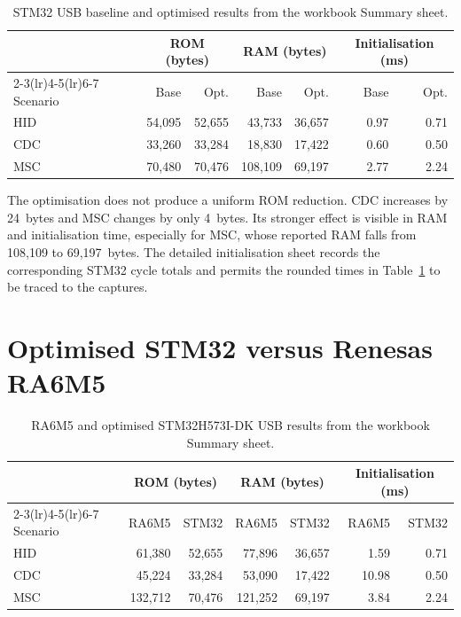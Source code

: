 \begin{table}[H]
\centering
\small
\caption{STM32 USB baseline and optimised results from the workbook Summary sheet.}
\label{tab:cascade-stm32-optimisation}
\begin{tabular}{lrrrrrr}
\toprule
& \multicolumn{2}{c}{ROM (bytes)} & \multicolumn{2}{c}{RAM (bytes)} & \multicolumn{2}{c}{Initialisation (ms)} \\
\cmidrule(lr){2-3}\cmidrule(lr){4-5}\cmidrule(lr){6-7}
Scenario & Base & Opt. & Base & Opt. & Base & Opt. \\
\midrule
HID & 54,095 & 52,655 & 43,733 & 36,657 & 0.97 & 0.71 \\
CDC & 33,260 & 33,284 & 18,830 & 17,422 & 0.60 & 0.50 \\
MSC & 70,480 & 70,476 & 108,109 & 69,197 & 2.77 & 2.24 \\
\bottomrule
\end{tabular}
\end{table}

The optimisation does not produce a uniform ROM reduction. CDC increases by 24~bytes and
MSC changes by only 4~bytes. Its stronger effect is visible in RAM and initialisation time,
especially for MSC, whose reported RAM falls from 108,109 to 69,197~bytes. The detailed
initialisation sheet records the corresponding STM32 cycle totals and permits the rounded
times in Table~\ref{tab:cascade-stm32-optimisation} to be traced to the captures.

\section{Optimised STM32 versus Renesas RA6M5}
\label{sec:cascade-pilot-renesas}

\begin{table}[H]
\centering
\small
\caption{RA6M5 and optimised STM32H573I-DK USB results from the workbook Summary sheet.}
\label{tab:cascade-renesas-results}
\begin{tabular}{lrrrrrr}
\toprule
& \multicolumn{2}{c}{ROM (bytes)} & \multicolumn{2}{c}{RAM (bytes)} & \multicolumn{2}{c}{Initialisation (ms)} \\
\cmidrule(lr){2-3}\cmidrule(lr){4-5}\cmidrule(lr){6-7}
Scenario & RA6M5 & STM32 & RA6M5 & STM32 & RA6M5 & STM32 \\
\midrule
HID & 61,380 & 52,655 & 77,896 & 36,657 & 1.59 & 0.71 \\
CDC & 45,224 & 33,284 & 53,090 & 17,422 & 10.98 & 0.50 \\
MSC & 132,712 & 70,476 & 121,252 & 69,197 & 3.84 & 2.24 \\
\bottomrule
\end{tabular}
\end{table}


